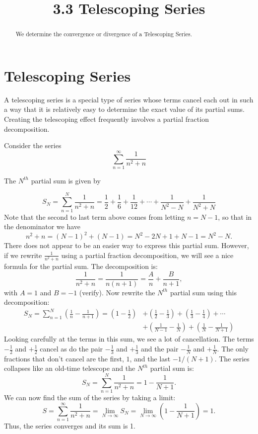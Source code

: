\documentclass[handout]{ximera}
\title{3.3 Telescoping Series}
\begin{document}
\begin{abstract}
We determine the convergence or divergence of a Telescoping Series.
\end{abstract}

\maketitle

\section{Telescoping Series}

A telescoping series is a special type of series whose terms cancel each out in such a way that it is relatively easy to determine the
exact value of its partial sums. Creating the telescoping effect frequently involves a partial fraction decomposition.

\begin{example}[example 1]
Consider the series
\[
\sum_{n=1}^\infty \frac{1}{n^2 +n}
\]

The $N^{th}$ partial sum is given by

\[
S_N = \sum_{n=1}^N \frac{1}{n^2 +n} = \frac{1}{2} + \frac{1}{6} + \frac{1}{12} + \cdots + \frac{1}{N^2 - N} + \frac{1}{N^2 + N}
\]
Note that the second to last term above comes from letting $n = N-1$, so that in the denominator we have 
\[
n^2 + n = (N-1)^2 + (N-1) = N^2 - 2N + 1 + N - 1 = N^2 -N.
\]
There does not appear to be an easier way to express this partial sum.
However, if we rewrite $\frac{1}{n^2 +n}$ using a partial fraction decomposition, we will see a nice formula for the partial sum.
The decomposition is:
\[
\frac{1}{n^2 + n} = \frac{1}{n(n+1)} = \frac{A}{n} + \frac{B}{n+1}, 
\]
with $A = 1$ and $B=-1$ (verify).
Now rewrite the $N^{th}$ partial sum using this decomposition:
\begin{align*}
S_N = \sum_{n=1}^N \left(\frac{1}{n}-\frac{1}{n+1}\right)= \left(1  - \frac12 \right) &+ \left(\frac12 - \frac13 \right) + \left(\frac13 - \frac14 \right) + \cdots \\
&+ \left(\frac{1}{N-1} - \frac{1}{N} \right) +\left(\frac{1}{N} - \frac{1}{N+1} \right) 
\end{align*}
Looking carefully at the terms in this sum, we see a lot of cancellation. The terms $-\frac12$ and $+\frac12$ cancel as do the pair
 $-\frac13$ and $+\frac13$ and the pair $-\frac{1}{N}$ and $+\frac{1}{N}$. The only fractions that don't cancel are the first, $1$, and the last $-1/(N+1)$.
 The series collapses like an old-time telescope and the $N^{th}$ partial sum is:
\[
S_N = \sum_{n=1}^N \frac{1}{n^2 +n} = 1 - \frac{1}{N+1}.
\]
We can now find the sum of the series by taking a limit:
\[
S = \sum_{n=1}^\infty  \frac{1}{n^2 +n} = \lim_{N\to \infty} S_N = \lim_{N\to \infty} \left(1 - \frac{1}{N+1}\right) = 1.
\]
Thus, the series converges and its sum is 1.
\end{example}
\end{document}
